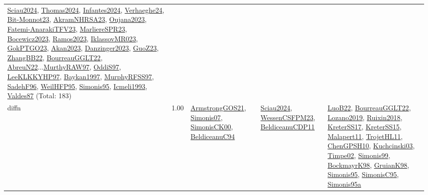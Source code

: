 {\begin{longtable}{p{3cm}r>{\raggedright\arraybackslash}p{6cm}>{\raggedright\arraybackslash}p{6cm}>{\raggedright\arraybackslash}p{8cm}}
\hyperref[detail:Sciau2024]{Sciau2024}, \hyperref[detail:Thomas2024]{Thomas2024}, \hyperref[detail:Infantes2024]{Infantes2024}, \hyperref[detail:Verhaeghe24]{Verhaeghe24}, \hyperref[detail:Bit-Monnot23]{Bit-Monnot23}, \hyperref[detail:AkramNHRSA23]{AkramNHRSA23}, \hyperref[detail:Oujana2023]{Oujana2023}, \hyperref[detail:Fatemi-AnarakiTFV23]{Fatemi-AnarakiTFV23}, \hyperref[detail:MarliereSPR23]{MarliereSPR23}, \hyperref[detail:Bocewicz2023]{Bocewicz2023}, \hyperref[detail:Ramos2023]{Ramos2023}, \hyperref[detail:IklassovMR023]{IklassovMR023}, \hyperref[detail:GokPTGO23]{GokPTGO23}, \hyperref[detail:Akan2023]{Akan2023}, \hyperref[detail:Danzinger2023]{Danzinger2023}, \hyperref[detail:GuoZ23]{GuoZ23}, \hyperref[detail:ZhangBB22]{ZhangBB22}, \hyperref[detail:BourreauGGLT22]{BourreauGGLT22}, \hyperref[detail:AbreuN22]{AbreuN22}...\hyperref[detail:MurthyRAW97]{MurthyRAW97}, \hyperref[detail:OddiS97]{OddiS97}, \hyperref[detail:LeeKLKKYHP97]{LeeKLKKYHP97}, \hyperref[detail:Baykan1997]{Baykan1997}, \hyperref[detail:MurphyRFSS97]{MurphyRFSS97}, \hyperref[detail:SadehF96]{SadehF96}, \hyperref[detail:WeilHFP95]{WeilHFP95}, \hyperref[detail:Simonis95]{Simonis95}, \hyperref[detail:Icmeli1993]{Icmeli1993}, \hyperref[detail:Valdes87]{Valdes87} (Total: 183)\\
\index{diffn}\index{Constraints!diffn}diffn &  1.00 & \hyperref[detail:ArmstrongGOS21]{ArmstrongGOS21}, \hyperref[detail:Simonis07]{Simonis07}, \hyperref[detail:SimonisCK00]{SimonisCK00}, \hyperref[detail:BeldiceanuC94]{BeldiceanuC94} & \hyperref[detail:Sciau2024]{Sciau2024}, \hyperref[detail:WessenCSFPM23]{WessenCSFPM23}, \hyperref[detail:BeldiceanuCDP11]{BeldiceanuCDP11} & \hyperref[detail:LuoB22]{LuoB22}, \hyperref[detail:BourreauGGLT22]{BourreauGGLT22}, \hyperref[detail:Lozano2019]{Lozano2019}, \hyperref[detail:Ruixin2018]{Ruixin2018}, \hyperref[detail:KreterSS17]{KreterSS17}, \hyperref[detail:KreterSS15]{KreterSS15}, \hyperref[detail:Malapert11]{Malapert11}, \hyperref[detail:TrojetHL11]{TrojetHL11}, \hyperref[detail:ChenGPSH10]{ChenGPSH10}, \hyperref[detail:Kuchcinski03]{Kuchcinski03}, \hyperref[detail:Timpe02]{Timpe02}, \hyperref[detail:Simonis99]{Simonis99}, \hyperref[detail:BockmayrK98]{BockmayrK98}, \hyperref[detail:GruianK98]{GruianK98}, \hyperref[detail:Simonis95]{Simonis95}, \hyperref[detail:SimonisC95]{SimonisC95}, \hyperref[detail:Simonis95a]{Simonis95a}\\

\end{longtable}}
